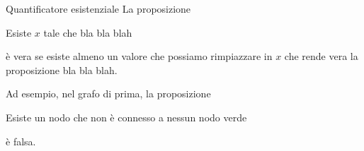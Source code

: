 \documentclass[aspectratio=169,10pt,dvipsnames]{beamer}
\begin{document}
\begin{frame}{Quantificatore esistenziale}
	La proposizione
	\begin{center}
		Esiste $x$ tale che bla bla blah
	\end{center}
	è vera se esiste almeno un valore che possiamo rimpiazzare in $x$ che rende vera la proposizione bla bla blah.

	Ad esempio, nel grafo di prima, la proposizione
	\begin{center}
		Esiste un nodo che non è connesso a nessun nodo verde
	\end{center}
	è falsa.
\end{frame}
\end{document}

